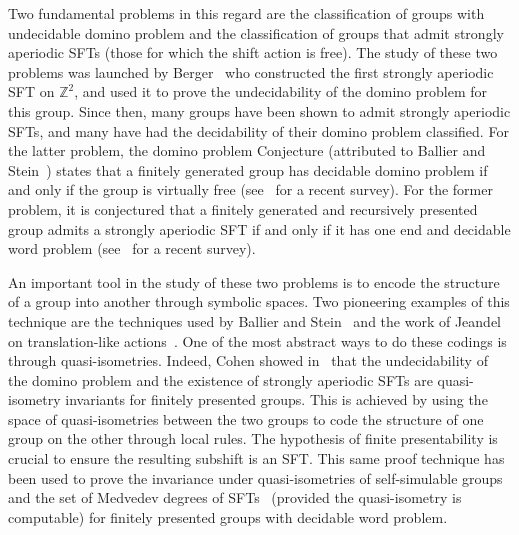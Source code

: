 \documentclass{article}
\theoremstyle{definition}
\theoremstyle{definition}
\newcommand{\Z}{\mathbb{Z}}
\begin{document}
Two fundamental problems in this regard are the classification of groups with undecidable domino problem and the classification of groups that admit strongly aperiodic SFTs (those for which the shift action is free). The study of these two problems was launched by Berger~\cite{berger1966undecidability} who constructed the first strongly aperiodic SFT on $\Z^2$, and used it to prove the undecidability of the domino problem for this group. Since then, many groups have been shown to admit strongly aperiodic SFTs, and many have had the decidability of their domino problem classified. For the latter problem, the domino problem Conjecture (attributed to Ballier and Stein~\cite{ballier2013domino}) states that a finitely generated group has decidable domino problem if and only if the group is virtually free (see~\cite[Chapter 2]{bitar2024tesis} for a recent survey). For the former problem, it is conjectured that a finitely generated and recursively presented group admits a strongly aperiodic SFT if and only if it has one end and decidable word problem (see~\cite{bitar2024realizability} for a recent survey).

An important tool in the study of these two problems is to encode the structure of a group into another through symbolic spaces. Two pioneering examples of this technique are the techniques used by Ballier and Stein~\cite{ballier2013domino} and the work of Jeandel on translation-like actions~\cite{jeandel2015translation}. One of the most abstract ways to do these codings is through quasi-isometries. Indeed, Cohen showed in~\cite{cohen2017large} that the undecidability of the domino problem and the existence of strongly aperiodic SFTs are quasi-isometry invariants for finitely presented groups. This is achieved by using the space of quasi-isometries between the two groups to code the structure of one group on the other through local rules. The hypothesis of finite presentability is crucial to ensure the resulting subshift is an SFT. This same proof technique has been used to prove the invariance under quasi-isometries of self-simulable groups~\cite{barbieri2021groups} and the set of Medvedev degrees of SFTs~\cite{barbieri2024medvedev} (provided the quasi-isometry is computable) for finitely presented groups with decidable word problem.
\end{document}
